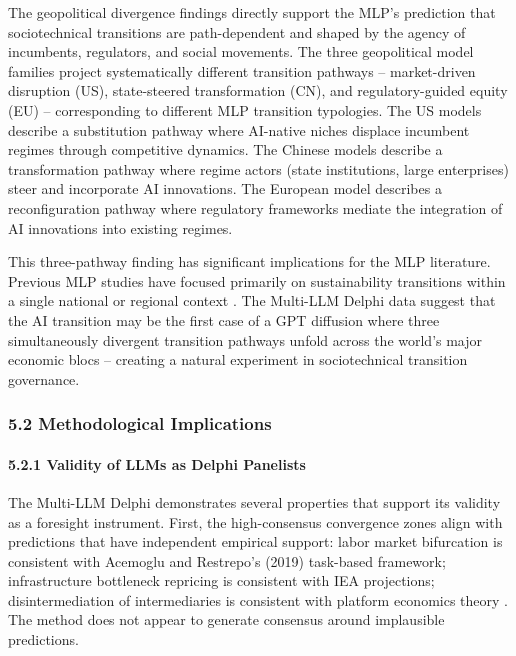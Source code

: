 \documentclass{article}
\begin{document}
The geopolitical divergence findings directly support the MLP's prediction that sociotechnical transitions are path-dependent and shaped by the agency of incumbents, regulators, and social movements. The three geopolitical model families project systematically different transition pathways -- market-driven disruption (US), state-steered transformation (CN), and regulatory-guided equity (EU) -- corresponding to different MLP transition typologies. The US models describe a substitution pathway where AI-native niches displace incumbent regimes through competitive dynamics. The Chinese models describe a transformation pathway where regime actors (state institutions, large enterprises) steer and incorporate AI innovations. The European model describes a reconfiguration pathway where regulatory frameworks mediate the integration of AI innovations into existing regimes.

This three-pathway finding has significant implications for the MLP literature. Previous MLP studies have focused primarily on sustainability transitions within a single national or regional context \citep{geels2020a, roberts2019accelerated}. The Multi-LLM Delphi data suggest that the AI transition may be the first case of a GPT diffusion where three simultaneously divergent transition pathways unfold across the world's major economic blocs -- creating a natural experiment in sociotechnical transition governance.


\subsubsection{5.2 Methodological Implications}
\label{sec:5_2_methodological_implications}


\paragraph{5.2.1 Validity of LLMs as Delphi Panelists}

The Multi-LLM Delphi demonstrates several properties that support its validity as a foresight instrument. First, the high-consensus convergence zones align with predictions that have independent empirical support: labor market bifurcation is consistent with Acemoglu and Restrepo's (2019) task-based framework; infrastructure bottleneck repricing is consistent with IEA projections; disintermediation of intermediaries is consistent with platform economics theory \citep{goldfarb2019digital}. The method does not appear to generate consensus around implausible predictions.
\end{document}
